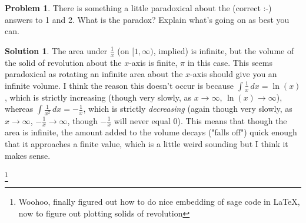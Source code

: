 \documentclass[10pt]{article}
\theoremstyle{definition}
\newtheorem{problem}{Problem}
\newtheorem{soln}{Solution}
\newcommand\nnfootnote[1]{%
  \begingroup
  \renewcommand\thefootnote{}\footnote{#1}%
  \addtocounter{footnote}{-1}%
  \endgroup
}
\begin{document}
\begin{problem}
There is something a little paradoxical about the (correct :-) answers to 1 and 2. What is the
paradox? Explain what's going on as best you can.
\end{problem}
\begin{soln}
    The area under $\frac{1}{x}$ (on $[1, \infty)$, implied) is infinite, but the volume of the solid of revolution about the $x$-axis is finite, $\pi$ in this case.
    This seems paradoxical as rotating an infinite area about the $x$-axis should give you an infinite volume. I think the reason this doesn't occur is because $\int \frac{1}{x} \,dx = \ln(x)$,
    which is strictly increasing (though very slowly, as $x\to\infty$, $\ln(x)\to\infty$), whereas $\int \frac{1}{x^2} \,dx = -\frac{1}{x}$,
    which is strictly \textit{decreasing} (again though very slowly, as $x\to\infty$, $-\frac{1}{x}\to\infty$, though $-\frac{1}{x}$ will never equal 0).
    This means that though the area is infinite, the amount added to the volume decays ("falls off") quick enough that it approaches a finite value, which is a little weird sounding but I think it makes sense.
\end{soln}

\nnfootnote{Woohoo, finally figured out how to do nice embedding of sage code in \LaTeX, now to figure out plotting solids of revolution}
\end{document}
